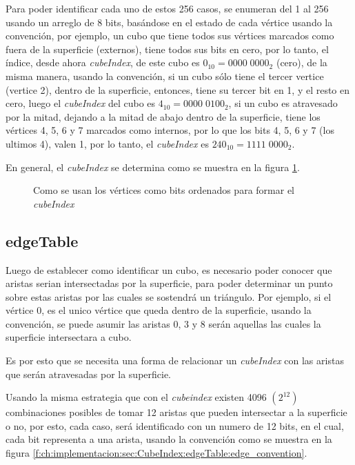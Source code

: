 Para poder identificar cada uno de estos 256 casos, se enumeran del 1 al 256 usando un arreglo de 8 bits, basándose en el estado de cada vértice usando la convención, por ejemplo, un cubo que tiene todos sus vértices marcados como fuera de la superficie (externos), tiene todos sus bits en cero, por lo tanto, el índice, desde ahora \emph{cubeIndex}, de este cubo es \hbox{$0_{10} = 0000 \; 0000_{2}$} (cero), de la misma manera, usando la convención, si un cubo sólo tiene el tercer vertice (vertice 2), dentro de la superficie, entonces, tiene su tercer bit en 1, y el resto en cero, luego el \emph{cubeIndex} del cubo es $4_{10} = 0000 \; 0100_{2}$, si un cubo es atravesado por la mitad, dejando a la mitad de abajo dentro de la superficie, tiene los vértices 4, 5, 6 y 7 marcados como internos, por lo que los bits 4, 5, 6 y 7 (los ultimos 4), valen 1, por lo tanto, el \emph{cubeIndex} es $240_{10} = 1111 \; 0000_{2}$.

En general, el \emph{cubeIndex} se determina como se muestra en la figura \ref{f:ch:implementacion:sec:CubeIndex:cubeindex:cubeindex}.

\begin{figure}[hbt]
	\makebox[\textwidth]{\framebox[0.9\textwidth]{\rule{0pt}{0.3\textwidth}}}
	\caption{Como se usan los vértices como bits ordenados para formar el \emph{cubeIndex}}
	\label{f:ch:implementacion:sec:CubeIndex:cubeindex:cubeindex}
\end{figure}

\subsection{edgeTable}
\label{ch:implementacion:sec:edgeTable}

Luego de establecer como identificar un cubo, es necesario poder conocer que aristas serian intersectadas por la superficie, para poder determinar un punto sobre estas aristas por las cuales se sostendrá un triángulo. Por ejemplo, si el vértice $0$, es el unico vértice que queda dentro de la superficie, usando la convención, se puede asumir las aristas $0$, $3$ y $8$ serán aquellas las cuales la superficie intersectara a cubo.

Es por esto que se necesita una forma de relacionar un \emph{cubeIndex} con las aristas que serán atravesadas por la superficie.

Usando la misma estrategia que con el \emph{cubeindex} existen 4096 $(2^{12})$ combinaciones posibles de tomar 12 aristas que pueden intersectar a la superficie o no, por esto, cada caso, será identificado con un numero de 12 bits, en el cual, cada bit representa a una arista, usando la convención como se muestra en la figura \ref{f:ch:implementacion:sec:CubeIndex:edgeTable:edge_convention}.

